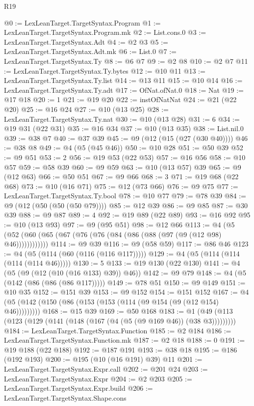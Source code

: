 \begin{lexlean}{R19}
\begin{coremodule}
@0 := LexLeanTarget.TargetSyntax.Program
@1 := LexLeanTarget.TargetSyntax.Program.mk
@2 := List.cons.{0}
@3 := LexLeanTarget.TargetSyntax.Adt
@4 := @2 @3
@5 := LexLeanTarget.TargetSyntax.Adt.mk
@6 := List.{0}
@7 := LexLeanTarget.TargetSyntax.Ty
@8 := @6 @7
@9 := @2 @8
@10 := @2 @7
@11 := LexLeanTarget.TargetSyntax.Ty.bytes
@12 := @10 @11
@13 := LexLeanTarget.TargetSyntax.Ty.list
@14 := @13 @11
@15 := @10 @14
@16 := LexLeanTarget.TargetSyntax.Ty.adt
@17 := OfNat.ofNat.{0}
@18 := Nat
@19 := @17 @18
@20 := 1
@21 := @19 @20
@22 := instOfNatNat
@24 := @21 (@22 @20)
@25 := @16 @24
@27 := @10 (@13 @25)
@28 := LexLeanTarget.TargetSyntax.Ty.nat
@30 := @10 (@13 @28)
@31 := 6
@34 := @19 @31 (@22 @31)
@35 := @16 @34
@37 := @10 (@13 @35)
@38 := List.nil.{0}
@39 := @38 @7
@40 := @37 @39
@45 := @9 (@12 (@15 (@27 (@30 @40))))
@46 := @38 @8
@49 := @4 (@5 (@45 @46))
@50 := @10 @28
@51 := @50 @39
@52 := @9 @51
@53 := 2
@56 := @19 @53 (@22 @53)
@57 := @16 @56
@58 := @10 @57
@59 := @58 @39
@60 := @9 @59
@63 := @10 (@13 @57) @39
@65 := @9 (@12 @63)
@66 := @50 @51
@67 := @9 @66
@68 := 3
@71 := @19 @68 (@22 @68)
@73 := @10 (@16 @71)
@75 := @12 (@73 @66)
@76 := @9 @75
@77 := LexLeanTarget.TargetSyntax.Ty.bool
@78 := @10 @77
@79 := @78 @39
@84 := @9 (@12 (@50 (@50 (@50 @79))))
@85 := @12 @39
@86 := @9 @85
@87 := @30 @39
@88 := @9 @87
@89 := 4
@92 := @19 @89 (@22 @89)
@93 := @16 @92
@95 := @10 (@13 @93)
@97 := @9 (@95 @51)
@98 := @12 @66
@113 := @4 (@5 (@52 (@60 (@65 (@67 (@76 (@76 (@84 (@86 (@88 (@97 (@9 (@12 @98) @46))))))))))))
@114 := @9 @39
@116 := @9 (@58 @59)
@117 := @86 @46
@123 := @4 (@5 (@114 (@60 (@116 (@116 @117)))))
@129 := @4 (@5 (@114 (@114 (@114 (@114 @46)))))
@130 := 5
@133 := @19 @130 (@22 @130)
@141 := @4 (@5 (@9 (@12 (@10 (@16 @133) @39)) @46))
@142 := @9 @79
@148 := @4 (@5 (@142 (@86 (@86 (@86 @117)))))
@149 := @78 @51
@150 := @9 @149
@151 := @10 @35
@152 := @151 @39
@153 := @9 @152
@154 := @151 @152
@167 := @4 (@5 (@142 (@150 (@86 (@153 (@153 (@114 (@9 @154 (@9 (@12 @154) @46)))))))))
@168 := @15 @39
@169 := @50 @168
@183 := @1 (@49 (@113 (@123 (@129 (@141 (@148 (@167 (@4 (@5 (@9 @169 @46)) (@38 @3)))))))))
@184 := LexLeanTarget.TargetSyntax.Function
@185 := @2 @184
@186 := LexLeanTarget.TargetSyntax.Function.mk
@187 := @2 @18
@188 := 0
@191 := @19 @188 (@22 @188)
@192 := @187 @191
@193 := @38 @18
@195 := @186 (@192 @193)
@200 := @195 (@10 (@16 @191) @39) @11
@201 := LexLeanTarget.TargetSyntax.Expr.call
@202 := @201 @24
@203 := LexLeanTarget.TargetSyntax.Expr
@204 := @2 @203
@205 := LexLeanTarget.TargetSyntax.Expr.build
@206 := LexLeanTarget.TargetSyntax.Shape.cons

\end{coremodule}
\end{lexlean}
